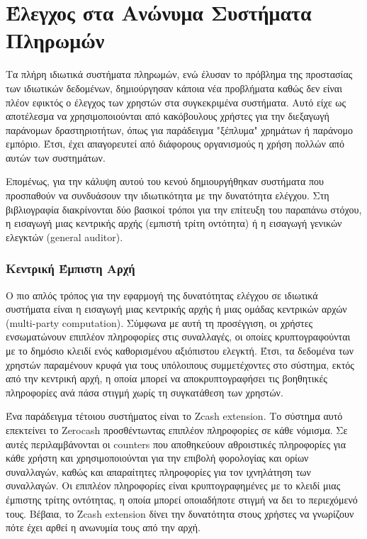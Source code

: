 \section{Έλεγχος στα Ανώνυμα Συστήματα Πληρωμών}
Τα πλήρη ιδιωτικά συστήματα πληρωμών, ενώ έλυσαν το πρόβλημα της προστασίας των ιδιωτικών δεδομένων, δημιούργησαν κάποια νέα προβλήματα καθώς δεν είναι πλέον εφικτός ο έλεγχος των χρηστών στα συγκεκριμένα συστήματα. Αυτό είχε ως αποτέλεσμα να χρησιμοποιούνται από κακόβουλους χρήστες για την διεξαγωγή παράνομων δραστηριοτήτων, όπως για παράδειγμα "ξέπλυμα" χρημάτων ή παράνομο εμπόριο. Έτσι, έχει απαγορευτεί από διάφορους οργανισμούς η χρήση πολλών από αυτών των συστημάτων.

Επομένως, για την κάλυψη αυτού του κενού δημιουργήθηκαν συστήματα που προσπαθούν να συνδυάσουν την ιδιωτικότητα με την δυνατότητα ελέγχου. Στη βιβλιογραφία διακρίνονται δύο βασικοί τρόποι για την επίτευξη του παραπάνω στόχου, η εισαγωγή μιας κεντρικής αρχής (εμπιστή τρίτη οντότητα) ή η εισαγωγή γενικών ελεγκτών (general auditor).

\subsubsection{Κεντρική Έμπιστη Αρχή}
Ο πιο απλός τρόπος για την εφαρμογή της δυνατότητας ελέγχου σε ιδιωτικά συστήματα είναι η εισαγωγή μιας κεντρικής αρχής ή μιας ομάδας κεντρικών αρχών (multi-party computation). Σύμφωνα με αυτή τη προσέγγιση, οι χρήστες ενσωματώνουν επιπλέον πληροφορίες στις συναλλαγές, οι οποίες κρυπτογραφούνται με το δημόσιο κλειδί ενός καθορισμένου αξιόπιστου ελεγκτή. Έτσι, τα δεδομένα των χρηστών παραμένουν κρυφά για τους υπόλοιπους συμμετέχοντες στο σύστημα, εκτός από την κεντρική αρχή, η οποία μπορεί να αποκρυπτογραφήσει τις βοηθητικές πληροφορίες ανά πάσα στιγμή χωρίς τη συγκατάθεση των χρηστών.

Ένα παράδειγμα τέτοιου συστήματος είναι το Zcash extension. Το σύστημα αυτό επεκτείνει το Zerocash προσθέντωντας επιπλέον πληροφορίες σε κάθε νόμισμα. Σε αυτές περιλαμβάνονται οι counters που αποθηκεύουν αθροιστικές πληροφορίες για κάθε χρήστη και χρησιμοποιούνται για την επιβολή φορολογίας και ορίων συναλλαγών, καθώς και απαραίτητες πληροφορίες για τον ιχνηλάτηση των συναλλαγών. Οι επιπλέον πληροφορίες είναι κρυπτογραφημένες με το κλειδί μιας έμπιστης τρίτης οντότητας, η οποία μπορεί οποιαδήποτε στιγμή να δει το περιεχόμενό τους. Βέβαια, το Zcash extension δίνει την δυνατότητα στους χρήστες να γνωρίζουν πότε έχει αρθεί η ανωνυμία τους από την αρχή.

